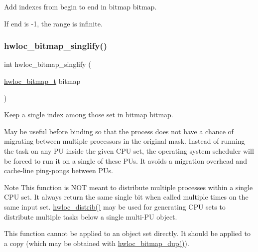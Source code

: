 Add indexes from {\ttfamily begin} to {\ttfamily end} in bitmap {\ttfamily bitmap}. 

If {\ttfamily end} is {\ttfamily -\/1}, the range is infinite. \mbox{\label{a00205_gaa611a77c092e679246afdf9a60d5db8b}} 
\subsubsection{\texorpdfstring{hwloc\+\_\+bitmap\+\_\+singlify()}{hwloc\_bitmap\_singlify()}}
{\footnotesize\ttfamily int hwloc\+\_\+bitmap\+\_\+singlify (\begin{DoxyParamCaption}\item[{\hyperlink{a00205_gaa3c2bf4c776d603dcebbb61b0c923d84}{hwloc\+\_\+bitmap\+\_\+t}}]{bitmap }\end{DoxyParamCaption})}



Keep a single index among those set in bitmap {\ttfamily bitmap}. 

May be useful before binding so that the process does not have a chance of migrating between multiple processors in the original mask. Instead of running the task on any PU inside the given C\+PU set, the operating system scheduler will be forced to run it on a single of these P\+Us. It avoids a migration overhead and cache-\/line ping-\/pongs between P\+Us.

\begin{DoxyNote}{Note}
This function is N\+OT meant to distribute multiple processes within a single C\+PU set. It always return the same single bit when called multiple times on the same input set. \hyperlink{a00201_ga7b0c28f797c2ff17fa2f244ebbd55b33}{hwloc\+\_\+distrib()} may be used for generating C\+PU sets to distribute multiple tasks below a single multi-\/\+PU object.

This function cannot be applied to an object set directly. It should be applied to a copy (which may be obtained with \hyperlink{a00205_gae679434c1a5f41d3560a8a7e2c1b0dee}{hwloc\+\_\+bitmap\+\_\+dup()}). 
\end{DoxyNote}
\mbox{\label{a00205_ga9511644657030a021dce9941e3cda583}} 
